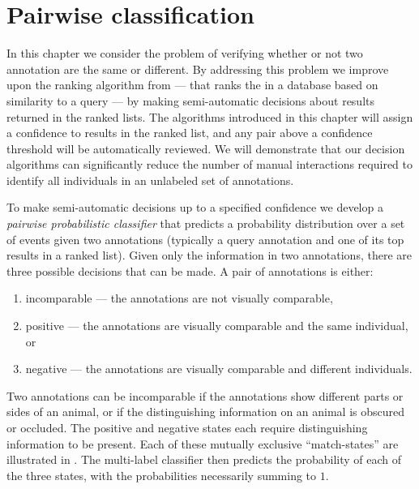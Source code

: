 \chapter{Pairwise classification}\label{chap:pairclf}

In this chapter we consider the problem of verifying whether or not two
  annotation are the same or different.
By addressing this problem we improve upon the ranking algorithm from
   --- that ranks the \names{} in a database based on
  similarity to a query --- by making semi-automatic decisions about results
  returned in the ranked lists.
The algorithms introduced in this chapter will assign a confidence to results
  in the ranked list, and any pair above a confidence threshold will be
  automatically reviewed.
We will demonstrate that our decision algorithms can significantly reduce the
  number of manual interactions required to identify all individuals in an
  unlabeled set of annotations.

To make semi-automatic decisions up to a specified confidence we develop a
  \emph{pairwise probabilistic classifier} that predicts a probability
  distribution over a set of events given two annotations (typically a query
  annotation and one of its top results in a ranked list).
Given only the information in two annotations,  there are three possible
  decisions that can be made.
A pair of annotations is either:
\begin{enumerate}
    \item incomparable --- the annotations are not visually comparable,

    \item positive --- the annotations are visually comparable and the
      same individual, or

    \item negative --- the annotations are visually comparable and different
      individuals.
\end{enumerate}
Two annotations can be incomparable if the annotations show different parts or
  sides of an animal, or if the distinguishing information on an animal is
  obscured or occluded.
The positive and negative states each require distinguishing information to be
  present.
Each of these mutually exclusive ``match-states'' are illustrated in
  .
The multi-label classifier then predicts the probability of each of the three
  states, with the probabilities necessarily summing to $1$.

